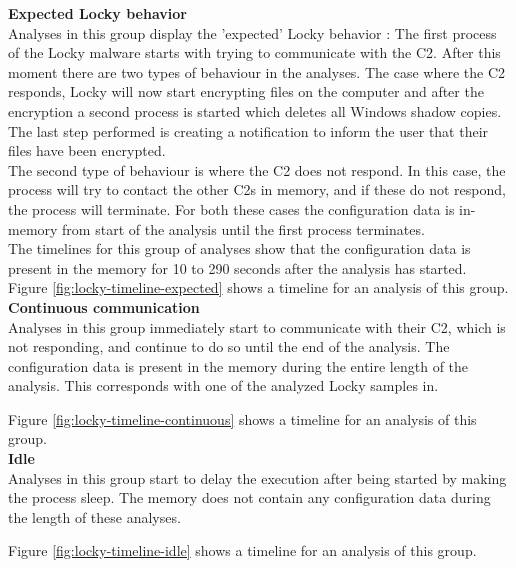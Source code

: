 \documentclass[conference]{IEEEtran}
\begin{document}
\textbf{Expected Locky behavior}
\\Analyses in this group display the 'expected' Locky behavior \cite{nelson-locky}: The first process of the Locky malware starts with trying to communicate with the C2. After this moment there are two types of behaviour in the analyses. The case where the C2 responds, Locky will now start encrypting files on the computer and after the encryption a second process is started which deletes all Windows shadow copies. The last step performed is creating a notification to inform the user that their files have been encrypted.\\

The second type of behaviour is where the C2 does not respond. In this case, the process will try to contact the other C2s in memory, and if these do not respond, the process will terminate. For both these cases the configuration data is in-memory from start of the analysis until the first process terminates.\\

The timelines for this group of analyses show that the configuration data is present in the memory for 10 to 290 seconds after the analysis has started.\\

Figure \ref{fig:locky-timeline-expected} shows a timeline for an analysis of this group.\\

\textbf{Continuous communication }\\
Analyses in this group immediately start to communicate with their C2, which is not responding, and continue to do so until the end of the analysis. The configuration data is present in the memory during the entire length of the analysis. This corresponds with one of the analyzed Locky samples in\cite{nelson-locky}.

Figure \ref{fig:locky-timeline-continuous} shows a timeline for an analysis of this group.\\
 
\textbf{Idle}\\
Analyses in this group start to delay the execution after being started by making the process sleep. The memory does not contain any configuration data during the length of these analyses.

Figure \ref{fig:locky-timeline-idle} shows a timeline for an analysis of this group.\\
\end{document}
